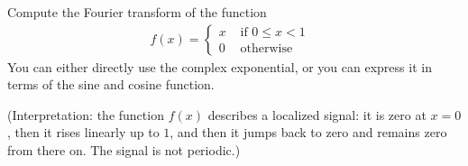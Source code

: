 \documentclass[11pt]{article}
\begin{document}
\begin{exercise}
    Compute the Fourier transform of the function
    \begin{gather*}
        f(x) = \left\{\begin{array}{ll}
            x   & \text{ if $0 \leq x < 1$ }
            \\
            0   & \text{ otherwise }
          \end{array}\right.
    \end{gather*}
    You can either directly use the complex exponential, or you can express it in terms of the sine and cosine function. 

    (Interpretation: the function $f(x)$ describes a localized signal: it is zero at $x=0$, then it rises linearly up to $1$, and then it jumps back to zero and remains zero from there on. The signal is not periodic.)
\end{exercise}
\end{document}
